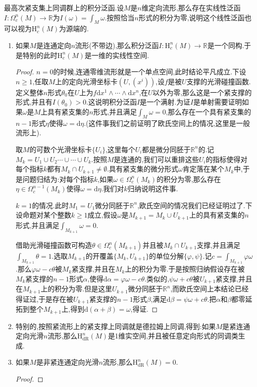 最高次紧支集上同调群上的积分泛函.设$M$是$n$维定向流形,那么存在实线性泛函$I:\Omega_c^n(M)\to\mathbb{R}$为$I(\omega)=\int_M\omega$.按照恰当$n$形式的积分为零,说明这个线性泛函也可以视为$\mathrm{H}_c^n(M)$为源端的.
\begin{enumerate}
	\item 如果$M$是连通定向$n$流形(不带边),那么积分泛函$I:\mathrm{H}_c^n(M)\to\mathbb{R}$是一个同构.于是特别的此时$\mathrm{H}^n_c(M)$是一维的实线性空间.
	\begin{proof}
		
		$n=0$的时候,连通零维流形就是一个单点空间,此时结论平凡成立.下设$n\ge1$,任取$M$上的定向光滑坐标卡$(U,(x^i))$,设$f$是被$U$支撑的光滑碰撞函数.定义整体$n$形式$\theta_0$在$U$上为$f\mathrm{d}x^1\wedge\cdots\wedge\mathrm{d}x^n$,在$U$以外为零,那么这是一个紧支撑的形式,并且有$I(\theta_0)>0$.这说明积分泛函$I$是一个满射.为证$I$是单射需要证明如果$\omega$是$M$上具有紧支集的$n$形式,并且满足$\int_M\omega=0$,那么存在一个具有紧支集的$n-1$形式$\eta$使得$\omega=\mathrm{d}\eta$.(这件事我们之前证明了欧氏空间上的情况,这里是一般流形上).
		
		取$M$的可数个光滑坐标卡$\{U_i\}$,这里每个$U_i$都是微分同胚于$\mathbb{R}^n$的.记$M_k=U_1\cup U_2\cdots\cup\cdots\cup U_k$.按照$M$是连通的,我们可以重排这些$U_i$的指标使得对每个指标$k$都有$M_k\cap U_{k+1}\not=\emptyset$.具有紧支集的微分形式$\omega$肯定落在某个$M_k$中,于是问题归结为:对每个指标$k$,如果$\omega\in\Omega_c^n(M_k)$的积分为零,那么存在$\eta\in\Omega_c^{n-1}(M_k)$使得$\omega=\mathrm{d}\eta$.我们对$k$归纳说明这件事.
		
		$k=1$的情况.此时$M_1=U_1$微分同胚于$\mathbb{R}^n$,欧氏空间的情况我们已经证明过了.下设命题对某个整数$k\ge1$成立,假设$\omega$是$M_{k+1}=M_k\cup U_{k+1}$上的具有紧支集的$n$形式,并且满足$\int_{M_{k+1}}\omega=0$.
		
		借助光滑碰撞函数可构造$\theta\in\Omega_c^n(M_{k+1})$并且被$M_k\cap U_{k+1}$支撑,并且满足$\int_{M_{k+1}}\theta=1$.选取$M_{k+1}$的开覆盖$\{M_k,U_{k+1}\}$的单位分解$\{\varphi,\psi\}$.记$c=\int_{M_{k+1}}\varphi\omega$.那么$\varphi\omega-c\theta$被$M_k$紧支撑,并且在$M_k$上的积分为零.于是按照归纳假设存在被$M_k$紧支撑的$n-1$形式$\alpha$,使得$\mathrm{d}\alpha=\varphi\omega-c\theta$.类似的,$\psi\omega+c\theta$被$U_{k+1}$紧支撑,并且在$M_{k+1}$上的积分为零.但是这里$U_{k+1}$微分同胚于$\mathbb{R}^n$,而欧氏空间上本结论已经得证过,于是存在被$U_{k+1}$紧支撑的$n-1$形式$\beta$,满足$\mathrm{d}\beta=\psi\omega+c\theta$.把$\alpha$和$\beta$都零延拓到整个$M_{k+1}$上,得到$\mathrm{d}(\alpha+\beta)=\omega$,得证.
	\end{proof}
    \item 特别的,按照紧流形上的紧支撑上同调就是德拉姆上同调,得到:如果$M$是紧连通定向光滑$n$流形,那么$\mathrm{H}^n_{\mathrm{dR}}(M)$是1维实空间,并且被任意定向形式的同调类生成.
    \item 如果$M$是非紧连通定向光滑$n$流形,那么$\mathrm{H}^n_{\mathrm{dR}}(M)=0$.
    \begin{proof}
    	

\end{proof}
\end{enumerate}
